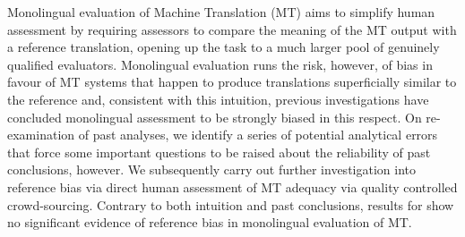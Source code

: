 Monolingual evaluation of Machine Translation (MT) aims to simplify human assessment by requiring assessors to compare the meaning of the MT output with a reference translation, opening up the task to a much larger pool of genuinely qualified evaluators. Monolingual evaluation runs the risk, however, of bias in favour of MT systems that happen to produce translations superficially similar to the reference and, consistent with this intuition, previous investigations have concluded monolingual assessment to be strongly biased in this respect. On re-examination of past analyses, we identify a series of potential analytical errors that force some important questions to be raised about the reliability of past conclusions, however. We subsequently carry out further investigation into reference bias via direct human assessment of MT adequacy via quality controlled crowd-sourcing. Contrary to both intuition and past conclusions, results for show no significant evidence of reference bias in monolingual evaluation of MT.
